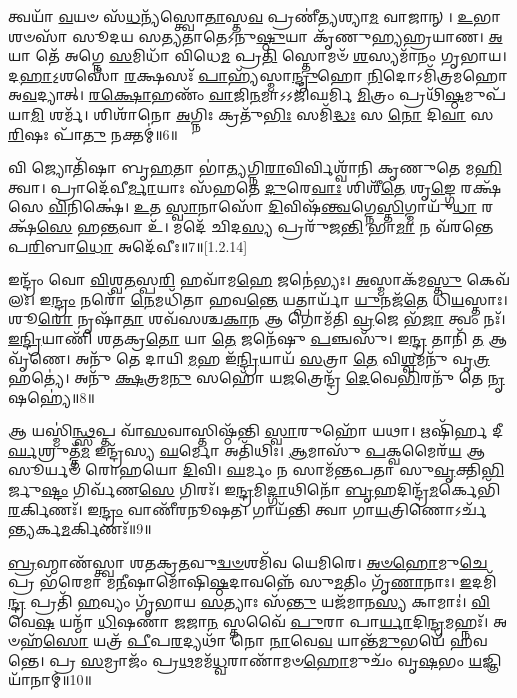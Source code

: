 𑌤𑍍𑌵𑌯𑌾᳴ \ul{𑌵}\-𑌯𑍞 𑌸᳴\-\ul{𑌧}\-𑌨𑍍𑌯᳴𑌸𑍍𑌤𑍍𑌵𑍋\-\ul{𑌤𑌾}\-𑌸𑍍𑌤\-\ul{𑌵} 𑌪𑍍𑌰𑌣𑍀॑𑌤𑍍𑌯𑌶𑍍𑌯𑌾\-\ul{𑌮} 𑌵𑌾𑌜𑌾𑌨𑍍। \ul{𑌉}\-𑌭𑌾 𑌶𑍞𑌸𑌾᳴ 𑌸𑍂𑌦𑌯 𑌸𑌤𑍍𑌯𑌤𑌾𑌤𑍇𑌽𑌨𑍁\-\ul{𑌷𑍍𑌠𑍁}\-𑌯𑌾 𑌕𑍃᳴𑌣𑍁𑌹𑍍𑌯𑌹𑍍𑌰𑌯𑌾𑌣। \ul{𑌅}\-𑌯𑌾 𑌤𑍇᳴ 𑌅𑌗𑍍𑌨𑍇 \ul{𑌸}\-𑌮𑌿𑌧𑌾᳴ 𑌵𑌿𑌧𑍇\-\ul{𑌮} 𑌪𑍍𑌰\-\ul{𑌤𑌿} 𑌸𑍍𑌤𑍋𑌮𑍞᳴ \ul{𑌶}\-𑌸𑍍𑌯𑌮𑌾᳴𑌨𑌂 𑌗𑍃𑌭𑌾𑌯। 𑌦\-\ul{𑌹𑌾}\-𑌽॒𑌶𑌸𑍋᳴ \ul{𑌰}\-𑌕𑍍𑌷𑌸𑌃᳴ \ul{𑌪𑌾}\-𑌹𑍍𑌯᳴𑌸𑍍𑌮𑌾\-\ul{𑌨𑍍𑌦𑍍𑌰𑍁}\-𑌹𑍋 \ul{𑌨𑌿}\-𑌦𑍋𑌽𑌮𑌿᳴𑌤𑍍𑌰𑌮𑌹𑍋 𑌅\-\ul{𑌵}\-𑌦𑍍𑌯𑌾𑌤𑍍। \ul{𑌰}\-\-\ul{𑌕𑍍𑌷𑍋}\-𑌹𑌣𑌂᳴ \ul{𑌵𑌾}\-𑌜𑌿\-\ul{𑌨}\-𑌮𑌾𑌽𑌽𑌜𑌿᳴𑌘𑌰𑍍𑌮𑌿 \ul{𑌮𑌿}\-𑌤𑍍𑌰𑌂 𑌪𑍍𑌰𑌥𑌿᳴\-\ul{𑌷𑍍𑌠}\-𑌮𑍁𑌪᳴ 𑌯𑌾\-\ul{𑌮𑌿} 𑌶𑌰𑍍𑌮᳴। 𑌶𑌿𑌶𑌾᳴𑌨𑍋 \ul{𑌅}\-𑌗𑍍𑌨𑌿𑌃 𑌕𑍍𑌰𑌤𑍁᳴\-\ul{𑌭𑌿𑌃} 𑌸𑌮𑌿᳴\-\ul{𑌦𑍍𑌧𑌃} 𑌸 \ul{𑌨𑍋} 𑌦𑌿\-\ul{𑌵𑌾} 𑌸 \ul{𑌰𑌿}\-𑌷𑌃 𑌪𑌾᳴\-\ul{𑌤𑍁} 𑌨𑌕𑍍𑌤𑌮𑍍॑॥6॥

 𑌵𑌿 𑌜𑍍𑌯𑍋𑌤𑌿᳴𑌷𑌾 𑌬𑍃\-\ul{𑌹}\-𑌤𑌾 𑌭𑌾॑\-\ul{𑌤𑍍𑌯}\-𑌗𑍍𑌨𑌿\-\ul{𑌰𑌾}\-𑌵𑌿𑌰𑍍𑌵𑌿𑌶𑍍𑌵𑌾᳴𑌨𑌿 𑌕𑍃𑌣𑍁𑌤𑍇 𑌮\-\ul{𑌹𑌿}\-𑌤𑍍𑌵𑌾। 𑌪𑍍𑌰𑌾𑌦𑍇᳴𑌵𑍀\-\ul{𑌰𑍍𑌮𑌾}\-𑌯𑌾𑌃 𑌸᳴𑌹𑌤𑍇 \ul{𑌦𑍁}\-𑌰𑍇\-\ul{𑌵𑌾𑌃} 𑌶𑌿𑌶𑍀᳴\-\ul{𑌤𑍇} 𑌶𑍃\-\ul{𑌙𑍍𑌗𑍇} 𑌰𑌕𑍍𑌷᳴𑌸𑍇 \ul{𑌵𑌿}\-𑌨𑌿𑌕𑍍𑌷𑍇॑। \ul{𑌉}\-𑌤 \ul{𑌸𑍍𑌵𑌾}\-𑌨𑌾𑌸𑍋᳴ \ul{𑌦𑌿}\-𑌵𑌿𑌷᳴\-\ul{𑌨𑍍𑌤𑍍𑌵}\-𑌗𑍍𑌨𑍇\-\ul{𑌸𑍍𑌤𑌿}\-𑌗𑍍𑌮𑌾𑌯𑍁᳴\-\ul{𑌧𑌾} 𑌰𑌕𑍍𑌷᳴\-\ul{𑌸𑍇} 𑌹\-\ul{𑌨𑍍𑌤}\-𑌵𑌾 𑌉᳴। 𑌮𑌦𑍇᳴ 𑌚𑌿𑌦\-\ul{𑌸𑍍𑌯} 𑌪𑍍𑌰𑌰𑍁᳴𑌜\-\ul{𑌨𑍍𑌤𑌿} 𑌭𑌾\-\ul{𑌮𑌾} 𑌨 𑌵᳴𑌰𑌨𑍍𑌤𑍇 𑌪\-\ul{𑌰𑌿}\-𑌬𑌾\-\ul{𑌧𑍋} 𑌅𑌦𑍇᳴𑌵𑍀𑌃॥7॥[1.2.14]

𑌇𑌨𑍍𑌦𑍍𑌰𑌂᳴ 𑌵𑍋 \ul{𑌵𑌿}\-𑌶𑍍𑌵\-\ul{𑌤}\-𑌸𑍍𑌪\-\ul{𑌰𑌿} 𑌹𑌵𑌾᳴𑌮\-\ul{𑌹𑍇} 𑌜𑌨𑍇॑𑌭𑍍𑌯𑌃। \ul{𑌅}\-𑌸𑍍𑌮𑌾𑌕᳴𑌮\-\ul{𑌸𑍍𑌤𑍁} 𑌕𑍇𑌵᳴𑌲𑌃। 𑌇\-\ul{𑌨𑍍𑌦𑍍𑌰𑌂} 𑌨𑌰𑍋᳴ \ul{𑌨𑍇}\-𑌮𑌧𑌿᳴𑌤𑌾 𑌹𑌵\-\ul{𑌨𑍍𑌤𑍇} 𑌯𑌤𑍍𑌪𑌾𑌰𑍍𑌯𑌾᳴ \ul{𑌯𑍁}\-𑌨𑌜᳴\-\ul{𑌤𑍇} 𑌧𑌿\-\ul{𑌯}\-𑌸𑍍𑌤𑌾𑌃। 𑌶𑍂\-\ul{𑌰𑍋} 𑌨𑍃𑌷𑌾᳴\-\ul{𑌤𑌾} 𑌶𑌵᳴𑌸𑌶𑍍𑌚\-\ul{𑌕𑌾}\-𑌨 𑌆 𑌗𑍋𑌮᳴𑌤𑌿 \ul{𑌵𑍍𑌰}\-𑌜𑍇 𑌭᳴\-\ul{𑌜𑌾} 𑌤𑍍𑌵𑌂 𑌨𑌃᳴। \ul{𑌇}\-\-\ul{𑌨𑍍𑌦𑍍𑌰𑌿}\-𑌯𑌾𑌣𑌿᳴ 𑌶𑌤𑌕𑍍𑌰\-\ul{𑌤𑍋} 𑌯𑌾 \ul{𑌤𑍇} 𑌜𑌨𑍇᳴𑌷𑍁 \ul{𑌪}\-𑌞𑍍𑌚𑌸𑍁᳴। 𑌇\-\ul{𑌨𑍍𑌦𑍍𑌰} 𑌤𑌾𑌨𑌿᳴ \ul{𑌤} 𑌆 𑌵𑍃᳴𑌣𑍇। 𑌅𑌨𑍁᳴ 𑌤𑍇 𑌦𑌾𑌯𑌿 \ul{𑌮}\-𑌹 𑌇᳴\-\ul{𑌨𑍍𑌦𑍍𑌰𑌿}\-𑌯𑌾𑌯᳴ \ul{𑌸}\-𑌤𑍍𑌰𑌾 \ul{𑌤𑍇} 𑌵𑌿\-\ul{𑌶𑍍𑌵}\-𑌮𑌨𑍁᳴ 𑌵𑍃\-\ul{𑌤𑍍𑌰}\-𑌹𑌤𑍍𑌯𑍇॑। 𑌅𑌨𑍁᳴ \ul{𑌕𑍍𑌷}\-𑌤𑍍𑌰𑌮\-\ul{𑌨𑍁} 𑌸𑌹𑍋᳴ 𑌯\-\ul{𑌜}\-𑌤𑍍𑌰𑍇𑌨𑍍𑌦𑍍𑌰᳴ \ul{𑌦𑍇}\-𑌵𑍇\-\ul{𑌭𑌿}\-𑌰𑌨𑍁᳴ 𑌤𑍇 \ul{𑌨𑍃}\-𑌷𑌹𑍍𑌯𑍇॑॥8॥

𑌆 𑌯𑌸𑍍𑌮𑌿॑\-\ul{𑌨𑍍𑌥𑍍𑌸}\-𑌪𑍍𑌤 𑌵𑌾᳴\-\ul{𑌸}\-𑌵𑌾𑌸𑍍𑌤𑌿𑌷𑍍𑌠᳴𑌨𑍍𑌤𑌿 \ul{𑌸𑍍𑌵𑌾}\-𑌰𑍁𑌹𑍋᳴ 𑌯𑌥𑌾। 𑌋𑌷𑌿᳴𑌰𑍍\mbox{}𑌹 𑌦𑍀\-\ul{𑌰𑍍𑌘}\-𑌶𑍍𑌰𑍁𑌤𑍍𑌤᳴\-\ul{𑌮} 𑌇𑌨𑍍𑌦𑍍𑌰᳴𑌸𑍍𑌯 \ul{𑌘}\-𑌰𑍍𑌮𑍋 𑌅𑌤𑌿᳴𑌥𑌿𑌃। \ul{𑌆}\-𑌮𑌾𑌸𑍁᳴ \ul{𑌪}\-𑌕𑍍𑌵𑌮𑍈𑌰᳴\-\ul{𑌯} 𑌆 𑌸𑍂𑌰𑍍𑌯𑍞᳴ 𑌰𑍋𑌹𑌯𑍋 \ul{𑌦𑌿}\-𑌵𑌿। \ul{𑌘}\-𑌰𑍍𑌮𑌂 𑌨 𑌸𑌾𑌮᳴𑌨𑍍𑌤𑌪𑌤𑌾 𑌸𑍁\-\ul{𑌵𑍃}\-𑌕𑍍𑌤𑌿\-\ul{𑌭𑌿}\-𑌰𑍍𑌜𑍁\-\ul{𑌷𑍍𑌟𑌂} 𑌗𑌿𑌰𑍍𑌵᳴𑌣\-\ul{𑌸𑍇} 𑌗𑌿𑌰𑌃᳴। 𑌇\-\ul{𑌨𑍍𑌦𑍍𑌰}\-𑌮𑌿\-\ul{𑌦𑍍𑌗𑌾}\-𑌥𑌿𑌨𑍋᳴ \ul{𑌬𑍃}\-𑌹𑌦𑌿𑌨𑍍𑌦𑍍𑌰᳴\-\ul{𑌮}\-𑌰𑍍𑌕𑍇𑌭𑌿᳴\-\ul{𑌰}\-𑌰𑍍𑌕𑌿𑌣𑌃᳴। 𑌇\-\ul{𑌨𑍍𑌦𑍍𑌰𑌂} 𑌵𑌾𑌣𑍀᳴𑌰𑌨𑍂𑌷𑌤। 𑌗𑌾𑌯᳴𑌨𑍍𑌤𑌿 𑌤𑍍𑌵𑌾 𑌗𑌾\-\ul{𑌯}\-𑌤𑍍𑌰𑌿𑌣𑍋𑌽𑌰𑍍𑌚᳴\-\ul{𑌨𑍍𑌤𑍍𑌯}\-𑌰𑍍𑌕\-\ul{𑌮}\-𑌰𑍍𑌕𑌿𑌣𑌃᳴॥9॥

 \ul{𑌬𑍍𑌰}\-𑌹𑍍𑌮𑌾𑌣᳴𑌸𑍍𑌤𑍍𑌵𑌾 𑌶𑌤𑌕𑍍𑌰\-\ul{𑌤}\-𑌵𑍁\-\ul{𑌦𑍍𑌵}\-\-\ul{𑍞}\-𑌶𑌮𑌿᳴𑌵 𑌯𑍇𑌮𑌿𑌰𑍇। \ul{𑌅}\-\-\ul{𑍞}\-\-\ul{𑌹𑍋}\-𑌮𑍁\-\ul{𑌚𑍇} 𑌪𑍍𑌰 𑌭᳴𑌰𑍇𑌮𑌾 𑌮\-\ul{𑌨𑍀}\-𑌷𑌾𑌮𑍋᳴𑌷𑌿\-\ul{𑌷𑍍𑌠}\-𑌦𑌾𑌵𑌨𑍍𑌨𑍇᳴ 𑌸𑍁\-\ul{𑌮}\-𑌤𑌿𑌂 𑌗𑍃᳴\-\ul{𑌣𑌾}\-𑌨𑌾𑌃। \ul{𑌇}\-𑌦𑌮𑌿᳴\-\ul{𑌨𑍍𑌦𑍍𑌰} 𑌪𑍍𑌰𑌤𑌿᳴ \ul{𑌹}\-𑌵𑍍𑌯𑌂 𑌗𑍃᳴𑌭𑌾𑌯 \ul{𑌸}\-𑌤𑍍𑌯𑌾𑌃 𑌸᳴\-\ul{𑌨𑍍𑌤𑍁} 𑌯𑌜᳴𑌮𑌾𑌨\-\ul{𑌸𑍍𑌯} 𑌕𑌾𑌮𑌾𑌃॑। \ul{𑌵𑌿}\-𑌵𑍇\-\ul{𑌷} 𑌯𑌨𑍍𑌮𑌾᳴ \ul{𑌧𑌿}\-𑌷𑌣𑌾᳴ \ul{𑌜}\-𑌜𑌾\-\ul{𑌨} 𑌸𑍍𑌤𑌵𑍈᳴ \ul{𑌪𑍁}\-𑌰𑌾 𑌪𑌾\-\ul{𑌰𑍍𑌯𑌾}\-𑌦𑌿\-\ul{𑌨𑍍𑌦𑍍𑌰}\-𑌮𑌹𑍍𑌨𑌃᳴। 𑌅𑍞𑌹᳴\-\ul{𑌸𑍋} 𑌯𑌤𑍍𑌰᳴ \ul{𑌪𑍀}\-𑌪\-\ul{𑌰}\-𑌦𑍍𑌯𑌥𑌾᳴ 𑌨𑍋 \ul{𑌨𑌾}\-𑌵𑍇\-\ul{𑌵} 𑌯𑌾𑌨𑍍𑌤᳴\-\ul{𑌮𑍁}\-𑌭𑌯𑍇᳴ 𑌹𑌵𑌨𑍍𑌤𑍇। 𑌪𑍍𑌰 \ul{𑌸}\-𑌮𑍍𑌰𑌾𑌜𑌂᳴ 𑌪𑍍𑌰\-\ul{𑌥}\-𑌮𑌮᳴\-\ul{𑌧𑍍𑌵}\-𑌰𑌾𑌣𑌾᳴𑌮𑍞\-\ul{𑌹𑍋}\-𑌮𑍁𑌚𑌂᳴ 𑌵𑍃\-\ul{𑌷}\-𑌭𑌂 \ul{𑌯}\-𑌜𑍍𑌞𑌿𑌯𑌾᳴𑌨𑌾𑌮𑍍॥10॥
 
